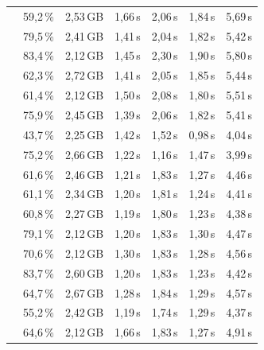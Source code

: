 \begin{table}[H]
\begin{tabularx}{\textwidth}{C C C C C C C}
                       & 59{,}2\,\% & 2{,}53\,GB & 1{,}66\,s & 2{,}06\,s & 1{,}84\,s & 5{,}69\,s \\
                       & 79{,}5\,\% & 2{,}41\,GB & 1{,}41\,s & 2{,}04\,s & 1{,}82\,s & 5{,}42\,s \\
                       & 83{,}4\,\% & 2{,}12\,GB & 1{,}45\,s & 2{,}30\,s & 1{,}90\,s & 5{,}80\,s \\
                       & 62{,}3\,\% & 2{,}72\,GB & 1{,}41\,s & 2{,}05\,s & 1{,}85\,s & 5{,}44\,s \\
                       & 61{,}4\,\% & 2{,}12\,GB & 1{,}50\,s & 2{,}08\,s & 1{,}80\,s & 5{,}51\,s \\
                       & 75{,}9\,\% & 2{,}45\,GB & 1{,}39\,s & 2{,}06\,s & 1{,}82\,s & 5{,}41\,s \\
                       & 43{,}7\,\% & 2{,}25\,GB & 1{,}42\,s & 1{,}52\,s & 0{,}98\,s & 4{,}04\,s \\
    \addlinespace[2pt]
                      & 75{,}2\,\% & 2{,}66\,GB & 1{,}22\,s & 1{,}16\,s & 1{,}47\,s & 3{,}99\,s \\
                       & 61{,}6\,\% & 2{,}46\,GB & 1{,}21\,s & 1{,}83\,s & 1{,}27\,s & 4{,}46\,s \\
                       & 61{,}1\,\% & 2{,}34\,GB & 1{,}20\,s & 1{,}81\,s & 1{,}24\,s & 4{,}41\,s \\
                       & 60{,}8\,\% & 2{,}27\,GB & 1{,}19\,s & 1{,}80\,s & 1{,}23\,s & 4{,}38\,s \\
                       & 79{,}1\,\% & 2{,}12\,GB & 1{,}20\,s & 1{,}83\,s & 1{,}30\,s & 4{,}47\,s \\
                       & 70{,}6\,\% & 2{,}12\,GB & 1{,}30\,s & 1{,}83\,s & 1{,}28\,s & 4{,}56\,s \\
                       & 83{,}7\,\% & 2{,}60\,GB & 1{,}20\,s & 1{,}83\,s & 1{,}23\,s & 4{,}42\,s \\
                       & 64{,}7\,\% & 2{,}67\,GB & 1{,}28\,s & 1{,}84\,s & 1{,}29\,s & 4{,}57\,s \\
                       & 55{,}2\,\% & 2{,}42\,GB & 1{,}19\,s & 1{,}74\,s & 1{,}29\,s & 4{,}37\,s \\
                       & 64{,}6\,\% & 2{,}12\,GB & 1{,}66\,s & 1{,}83\,s & 1{,}27\,s & 4{,}91\,s \\
    \bottomrule
  \end{tabularx}
\end{table}